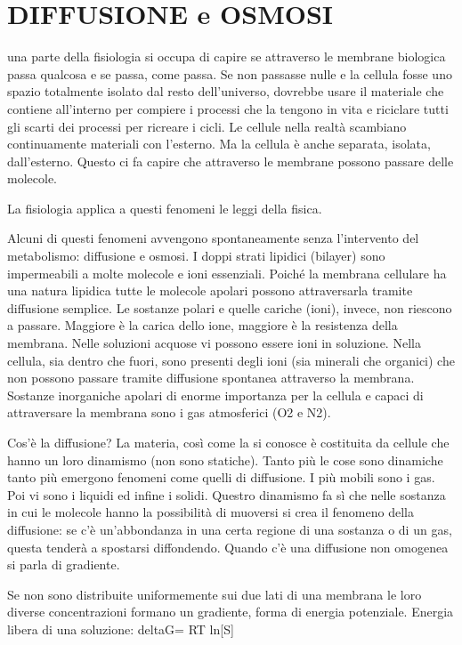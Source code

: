 \documentclass[]{article}
\begin{document}
\section{DIFFUSIONE e OSMOSI}\label{diffusione-e-osmosi}

una parte della fisiologia si occupa di capire se attraverso le membrane
biologica passa qualcosa e se passa, come passa. Se non passasse nulle e
la cellula fosse uno spazio totalmente isolato dal resto dell'universo,
dovrebbe usare il materiale che contiene all'interno per compiere i
processi che la tengono in vita e riciclare tutti gli scarti dei
processi per ricreare i cicli. Le cellule nella realtà scambiano
continuamente materiali con l'esterno. Ma la cellula è anche separata,
isolata, dall'esterno. Questo ci fa capire che attraverso le membrane
possono passare delle molecole.

La fisiologia applica a questi fenomeni le leggi della fisica.

Alcuni di questi fenomeni avvengono spontaneamente senza l'intervento
del metabolismo: diffusione e osmosi. I doppi strati lipidici (bilayer)
sono impermeabili a molte molecole e ioni essenziali. Poiché la membrana
cellulare ha una natura lipidica tutte le molecole apolari possono
attraversarla tramite diffusione semplice. Le sostanze polari e quelle
cariche (ioni), invece, non riescono a passare. Maggiore è la carica
dello ione, maggiore è la resistenza della membrana. Nelle soluzioni
acquose vi possono essere ioni in soluzione. Nella cellula, sia dentro
che fuori, sono presenti degli ioni (sia minerali che organici) che non
possono passare tramite diffusione spontanea attraverso la membrana.
Sostanze inorganiche apolari di enorme importanza per la cellula e
capaci di attraversare la membrana sono i gas atmosferici (O2 e N2).

Cos'è la diffusione? La materia, così come la si conosce è costituita da
cellule che hanno un loro dinamismo (non sono statiche). Tanto più le
cose sono dinamiche tanto più emergono fenomeni come quelli di
diffusione. I più mobili sono i gas. Poi vi sono i liquidi ed infine i
solidi. Questro dinamismo fa sì che nelle sostanza in cui le molecole
hanno la possibilità di muoversi si crea il fenomeno della diffusione:
se c'è un'abbondanza in una certa regione di una sostanza o di un gas,
questa tenderà a spostarsi diffondendo. Quando c'è una diffusione non
omogenea si parla di gradiente.

Se non sono distribuite uniformemente sui due lati di una membrana le
loro diverse concentrazioni formano un gradiente, forma di energia
potenziale. Energia libera di una soluzione: deltaG= RT ln{[}S{]}
\end{document}
